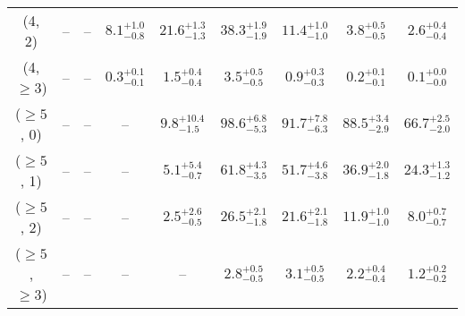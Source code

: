 \begin{table}[h!]
{\begin{tabular}{ccccccccc}
	(4, 2) & -- & -- & $8.1^{+ 1.0 }_{- 0.8 }$ & $21.6^{+ 1.3 }_{- 1.3 }$ & $38.3^{+ 1.9 }_{- 1.9 }$ & $11.4^{+ 1.0 }_{- 1.0 }$ & $3.8^{+ 0.5 }_{- 0.5 }$ & $2.6^{+ 0.4 }_{- 0.4 }$ \\[0.5ex] 
	(4, $\ge3$) & -- & -- & $0.3^{+ 0.1 }_{- 0.1 }$ & $1.5^{+ 0.4 }_{- 0.4 }$ & $3.5^{+ 0.5 }_{- 0.5 }$ & $0.9^{+ 0.3 }_{- 0.3 }$ & $0.2^{+ 0.1 }_{- 0.1 }$ & $0.1^{+ 0.0 }_{- 0.0 }$ \\[0.5ex] 
	($\ge5$, 0) & -- & -- & -- & $9.8^{+ 10.4 }_{- 1.5 }$ & $98.6^{+ 6.8 }_{- 5.3 }$ & $91.7^{+ 7.8 }_{- 6.3 }$ & $88.5^{+ 3.4 }_{- 2.9 }$ & $66.7^{+ 2.5 }_{- 2.0 }$ \\[0.5ex] 
	($\ge5$, 1) & -- & -- & -- & $5.1^{+ 5.4 }_{- 0.7 }$ & $61.8^{+ 4.3 }_{- 3.5 }$ & $51.7^{+ 4.6 }_{- 3.8 }$ & $36.9^{+ 2.0 }_{- 1.8 }$ & $24.3^{+ 1.3 }_{- 1.2 }$ \\[0.5ex] 
	($\ge5$, 2) & -- & -- & -- & $2.5^{+ 2.6 }_{- 0.5 }$ & $26.5^{+ 2.1 }_{- 1.8 }$ & $21.6^{+ 2.1 }_{- 1.8 }$ & $11.9^{+ 1.0 }_{- 1.0 }$ & $8.0^{+ 0.7 }_{- 0.7 }$ \\[0.5ex] 
	($\ge5$, $\ge3$) & -- & -- & -- & -- & $2.8^{+ 0.5 }_{- 0.5 }$ & $3.1^{+ 0.5 }_{- 0.5 }$ & $2.2^{+ 0.4 }_{- 0.4 }$ & $1.2^{+ 0.2 }_{- 0.2 }$ \\[0.5ex] 
	\hline
	\hline
\end{tabular}}
\end{table}
